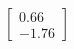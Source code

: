 \documentclass[preview]{standalone}
\begin{document}
\begin{align*}
\begin{bmatrix} 0.66 \\ -1.76 \end{bmatrix}
\end{align*}
\end{document}
